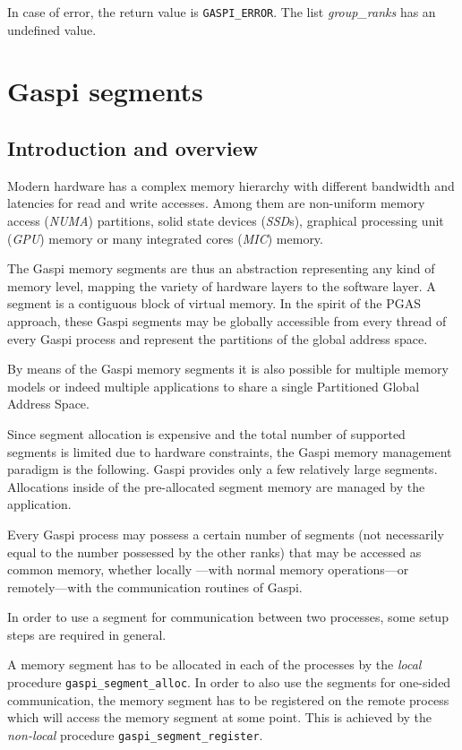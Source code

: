\documentclass[a4paper]{article}
\newlength{\st}\setlength{\st}{0pt}
\newcommand{\zsep}[1]{#1}
\newcommand{\gaspiprefix}{gaspi}
\newcommand{\GASPI}{{\sc Gaspi}}
\newcommand{\function}[1]{{\tt #1}}
\newcommand{\parameter}[1]{{\it #1}}
\newcommand{\gaspifunction}[1]{\function{\protect\zsep{\gaspiprefix\_#1}}}
\newcommand{\GASPIGERR}{{\tt\protect\zsep{GASPI\_ERROR}}}
\newcommand{\gaspisemantic}[1]{{\emph{#1}}}
\begin{document}
In case of error, the return value is \GASPIGERR{}. The list
\parameter{group\_ranks} has an undefined value.

\section{\GASPI{} segments}

\subsection{Introduction and overview}

Modern hardware has a complex memory hierarchy with different
bandwidth and latencies for read and write accesses. Among them are
non-uniform memory access (\emph{NUMA}) partitions, solid state
devices (\emph{SSD}s), graphical processing unit (\emph{GPU}) memory
or many integrated cores (\emph{MIC}) memory.

The \GASPI{} memory segments are thus an abstraction representing
any kind of memory level, mapping the variety of hardware layers to the
software layer. A segment is a contiguous block of virtual memory.
In the spirit of the PGAS approach, these \GASPI{}
segments may be globally accessible from every thread of every \GASPI{}
process and represent the partitions of the global address space.

By means of the \GASPI{} memory segments it is also possible for multiple
memory models or indeed multiple applications to share a single Partitioned Global
Address Space.

Since segment allocation is expensive and the total number of supported
segments is limited due to hardware constraints, the \GASPI{} memory
management paradigm is the following.
\GASPI{} provides only a few relatively large segments.
Allocations inside of the pre-allocated segment memory are managed
by the application.

Every \GASPI{} process may possess a certain number of segments (not
necessarily equal to the number possessed by the other ranks) that may be accessed as common memory,
whether locally ---with normal memory operations---or remotely---with
the communication routines of \GASPI{}.

In order to use a segment for communication between two processes,
some setup steps are required in general.

A memory segment has to be allocated in each of the processes
by the \gaspisemantic{local} procedure \gaspifunction{segment\_alloc}.
In order to also use the segments for one-sided communication, the memory segment
has to be registered on the remote process which will
access the memory segment at some point. This is achieved by the
\gaspisemantic{non-local} procedure \gaspifunction{segment\_register}.
\end{document}
